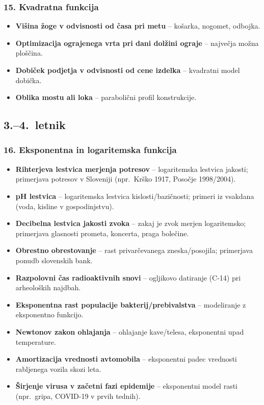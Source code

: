 \documentclass[11pt,a4paper]{article}
\begin{document}
\subsubsection*{15. Kvadratna funkcija}
\begin{itemize}
  \item \textbf{Višina žoge v odvisnosti od časa pri metu} -- košarka, nogomet, odbojka.
  \item \textbf{Optimizacija ograjenega vrta pri dani dolžini ograje} -- največja možna ploščina.
  \item \textbf{Dobiček podjetja v odvisnosti od cene izdelka} -- kvadratni model dobička.
  \item \textbf{Oblika mostu ali loka} -- parabolični profil konstrukcije.
\end{itemize}

\subsection{3.--4.\ letnik}

\subsubsection*{16. Eksponentna in logaritemska funkcija}
\begin{itemize}
  \item \textbf{Rihterjeva lestvica merjenja potresov} -- logaritemska lestvica jakosti; primerjava potresov v Sloveniji (npr.\ Krško 1917, Posočje 1998/2004).
  \item \textbf{pH lestvica} -- logaritemska lestvica kislosti/bazičnosti; primeri iz vsakdana (voda, kisline v gospodinjstvu).
  \item \textbf{Decibelna lestvica jakosti zvoka} -- zakaj je zvok merjen logaritemsko; primerjava glasnosti prometa, koncerta, praga bolečine.
  \item \textbf{Obrestno obrestovanje} -- rast privarčevanega zneska/posojila; primerjava ponudb slovenskih bank.
  \item \textbf{Razpolovni čas radioaktivnih snovi} -- ogljikovo datiranje (C-14) pri arheoloških najdbah.
  \item \textbf{Eksponentna rast populacije bakterij/prebivalstva} -- modeliranje z eksponentno funkcijo.
  \item \textbf{Newtonov zakon ohlajanja} -- ohlajanje kave/telesa, eksponentni upad temperature.
  \item \textbf{Amortizacija vrednosti avtomobila} -- eksponentni padec vrednosti rabljenega vozila skozi leta.
  \item \textbf{Širjenje virusa v začetni fazi epidemije} -- eksponentni model rasti (npr.\ gripa, COVID-19 v prvih tednih).
\end{itemize}
\end{document}
